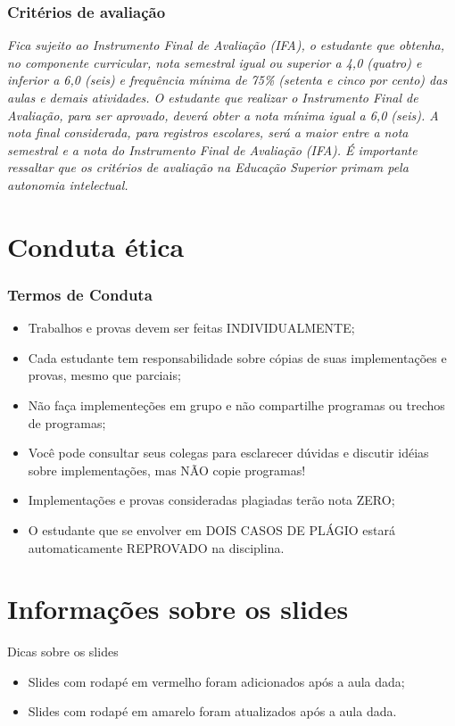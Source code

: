 \documentclass{beamer}
\begin{document}
\begin{frame}[fragile]\justifying
      \frametitle{Critérios de avaliação}
      \textit{Fica sujeito ao Instrumento Final de Avaliação (IFA), o estudante que obtenha, no componente curricular, nota semestral igual ou superior a
      4,0 (quatro) e inferior a 6,0 (seis) e frequência mínima de 75\% (setenta e cinco por cento) das aulas e demais atividades. O estudante que realizar o Instrumento Final de
      Avaliação, para ser aprovado, deverá obter a nota mínima igual a 6,0 (seis). A nota final considerada, para registros escolares, será a maior entre a nota semestral e a nota do
      Instrumento Final de Avaliação (IFA). 
      \newline
      \newline
      É importante ressaltar que os critérios de avaliação na Educação Superior primam pela autonomia intelectual.}
\end{frame}

\section{Conduta ética}
\begin{frame}
\frametitle{Termos de Conduta}
      \begin{itemize}
            \item Trabalhos e provas devem ser feitas INDIVIDUALMENTE;
            \item Cada estudante tem responsabilidade sobre cópias de suas implementações e provas, mesmo que parciais;
            \item Não faça implementeções em grupo e não compartilhe programas ou trechos de programas;
            \item Você pode consultar seus colegas para esclarecer dúvidas e discutir idéias sobre implementações, mas NÃO copie programas!
            \item Implementações e provas consideradas plagiadas terão nota ZERO;
            \item O estudante que se envolver em DOIS CASOS DE PLÁGIO estará automaticamente REPROVADO na disciplina.
      \end{itemize}
\end{frame}

\section{Informações sobre os slides}

\begin{frame}[fragile]{Dicas sobre os slides}
      
      \begin{itemize}
            \item Slides com rodapé em vermelho foram adicionados após a aula dada;
            \item Slides com rodapé em amarelo foram atualizados  após a aula dada.
      \end{itemize}
\end{frame}
\end{document}
